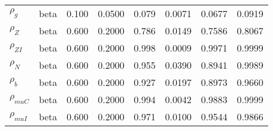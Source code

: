 \begin{center}
\begin{longtable}{llcccccc}
${\rho_g}$ & beta &   0.100 & 0.0500 &   0.079& 0.0071 &  0.0677 &  0.0919 \\ 
${\rho_Z}$ & beta &   0.600 & 0.2000 &   0.786& 0.0149 &  0.7586 &  0.8067 \\ 
${\rho_{ZI}}$ & beta &   0.600 & 0.2000 &   0.998& 0.0009 &  0.9971 &  0.9999 \\ 
${\rho_N}$ & beta &   0.600 & 0.2000 &   0.955& 0.0390 &  0.8941 &  0.9989 \\ 
${\rho_b}$ & beta &   0.600 & 0.2000 &   0.927& 0.0197 &  0.8973 &  0.9660 \\ 
${\rho_{muC}}$ & beta &   0.600 & 0.2000 &   0.994& 0.0042 &  0.9883 &  0.9999 \\ 
${\rho_{muI}}$ & beta &   0.600 & 0.2000 &   0.971& 0.0100 &  0.9544 &  0.9866 \\ 
\end{longtable}
 \end{center}
